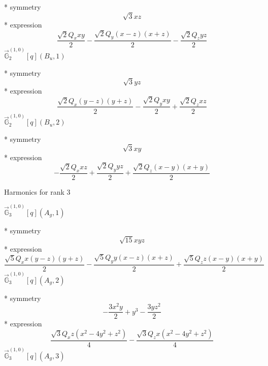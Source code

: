 \documentclass[fleqn,8pt]{jsarticle}
\begin{document}
\noindent\quad ** symmetry
\begin{dmath*}
\sqrt{3} x z
\end{dmath*}
\noindent\quad ** expression
\begin{dmath*}
\frac{\sqrt{2} Q_{x} x y}{2} - \frac{\sqrt{2} Q_{y} \left(x - z\right) \left(x + z\right)}{2} - \frac{\sqrt{2} Q_{z} y z}{2}
\end{dmath*}
\noindent\quad $\vec{\mathbb{G}}_{2}^{(1,0)}[q](B_{u},1)$

\noindent\quad ** symmetry
\begin{dmath*}
\sqrt{3} y z
\end{dmath*}
\noindent\quad ** expression
\begin{dmath*}
\frac{\sqrt{2} Q_{x} \left(y - z\right) \left(y + z\right)}{2} - \frac{\sqrt{2} Q_{y} x y}{2} + \frac{\sqrt{2} Q_{z} x z}{2}
\end{dmath*}
\noindent\quad $\vec{\mathbb{G}}_{2}^{(1,0)}[q](B_{u},2)$

\noindent\quad ** symmetry
\begin{dmath*}
\sqrt{3} x y
\end{dmath*}
\noindent\quad ** expression
\begin{dmath*}
- \frac{\sqrt{2} Q_{x} x z}{2} + \frac{\sqrt{2} Q_{y} y z}{2} + \frac{\sqrt{2} Q_{z} \left(x - y\right) \left(x + y\right)}{2}
\end{dmath*}

\noindent * Harmonics for rank 3

\noindent\quad $\vec{\mathbb{G}}_{3}^{(1,0)}[q](A_{g},1)$

\noindent\quad ** symmetry
\begin{dmath*}
\sqrt{15} x y z
\end{dmath*}
\noindent\quad ** expression
\begin{dmath*}
\frac{\sqrt{5} Q_{x} x \left(y - z\right) \left(y + z\right)}{2} - \frac{\sqrt{5} Q_{y} y \left(x - z\right) \left(x + z\right)}{2} + \frac{\sqrt{5} Q_{z} z \left(x - y\right) \left(x + y\right)}{2}
\end{dmath*}
\noindent\quad $\vec{\mathbb{G}}_{3}^{(1,0)}[q](A_{g},2)$

\noindent\quad ** symmetry
\begin{dmath*}
- \frac{3 x^{2} y}{2} + y^{3} - \frac{3 y z^{2}}{2}
\end{dmath*}
\noindent\quad ** expression
\begin{dmath*}
\frac{\sqrt{3} Q_{x} z \left(x^{2} - 4 y^{2} + z^{2}\right)}{4} - \frac{\sqrt{3} Q_{z} x \left(x^{2} - 4 y^{2} + z^{2}\right)}{4}
\end{dmath*}
\noindent\quad $\vec{\mathbb{G}}_{3}^{(1,0)}[q](A_{g},3)$
\end{document}
